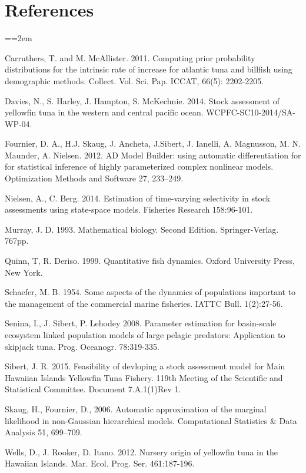 \documentclass[12pt,letterpaper,twoside]{article}
\newcommand\doublespacing{\baselineskip=1.6\normalbaselineskip}
\begin{document}
\section*{References}
{\parindent=0cm \small
\everypar={\hangindent=2em }\par
Carruthers, T. and M. McAllister. 2011.
Computing prior probability distributions for the
intrinsic rate of increase for atlantic tuna and
billfish using demographic methods.
Collect. Vol. Sci. Pap. ICCAT, 66(5): 2202-2205.

Davies, N., S. Harley, J. Hampton, S. McKechnie. 2014. Stock
assessment of yellowfin tuna in the western and central pacific ocean.
WCPFC-SC10-2014/SA-WP-04.

Fournier, D. A., H.J. Skaug, J. Ancheta, J.Sibert, J. Ianelli, 
A. Magnusson, M. N. Maunder, A. Nielsen. 2012. AD Model Builder:
using automatic differentiation for for statistical inference of highly
parameterized complex nonlinear models. Optimization Methods and
Software 27, 233–249.

Nielsen, A., C. Berg. 2014. Estimation of time-varying selectivity
in stock assessments using state-space models. Fisheries Research
158:96-101.

Murray, J. D. 1993. Mathematical biology. Second Edition.
Springer-Verlag. 767pp.

Quinn, T, R. Deriso. 1999. Quantitative fish dynamics. Oxford
University Press, New York.

Schaefer, M. B. 1954. Some aspects of the dynamics of populations
important to the management of the commercial marine fisheries. IATTC
Bull. 1(2):27-56.

Senina, I., J. Sibert, P. Lehodey  2008. Parameter estimation for
basin-scale ecosystem linked population models of large pelagic
predators: Application to skipjack tuna.  Prog. Oceanogr. 78:319-335.

Sibert, J. R. 2015. Feasibility of devloping a stock assessment
model for Main Hawaiian Islands Yellowfin Tuna Fishery.
119th Meeting of the Scientific and Statistical Committee.
Document 7.A.1(1)Rev 1.

Skaug, H., Fournier, D., 2006. Automatic approximation of the marginal
likelihood in non-Gaussian hierarchical models. Computational
Statistics \& Data Analysis 51, 699–709.

Wells, D., J. Rooker, D. Itano. 2012.  Nursery origin of yellowfin
tuna in the Hawaiian Islands. Mar. Ecol. Prog. Ser. 461:187-196. 
\par}
\end{document}
